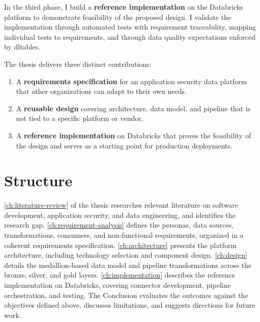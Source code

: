 In the third phase, I build a \textbf{reference implementation} on the Databricks platform to demonstrate feasibility of the proposed design. I validate the implementation through automated tests with requirement traceability, mapping individual tests to requirements, and through data quality expectations enforced by \gls{dltables}.

The thesis delivers three distinct contributions:
\begin{enumerate}
    \item A \textbf{requirements specification} for an application security data platform that other organizations can adapt to their own needs.
    \item A \textbf{reusable design} covering architecture, data model, and pipeline that is not tied to a specific platform or vendor.
    \item A \textbf{reference implementation} on Databricks that proves the feasibility of the design and serves as a starting point for production deployments.
\end{enumerate}

\section*{Structure}

\autoref{ch:literature-review} of the thesis researches relevant literature on software development, application security, and data engineering, and identifies the research gap. \autoref{ch:requirement-analysis} defines the personas, data sources, transformations, consumers, and non-fun\-ctio\-nal requirements, organized in a coherent requirements specification. \autoref{ch:architecture} presents the platform architecture, including technology selection and component design. \autoref{ch:design} details the medallion-based data model and pipeline transformations across the bronze, silver, and gold layers. \autoref{ch:implementation} describes the reference implementation on Da\-ta\-bricks, covering connector development, pipeline orchestration, and testing. The Conclusion evaluates the outcomes against the objectives defined above, discusses limitations, and suggests directions for future work.